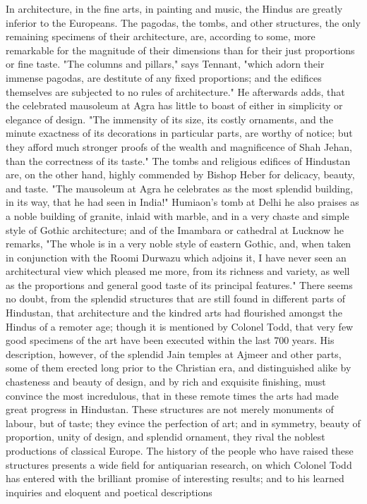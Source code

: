 \documentclass{article}
\begin{document}
In architecture, in the fine arts, in painting and music, the Hindus are greatly inferior to the Europeans. The pagodas, the tombs, and other structures, the only remaining specimens of their architecture, are, according to some, more remarkable for the magnitude of their dimensions than for their just proportions or fine taste. "The columns and pillars," says Tennant, "which adorn their immense pagodas, are destitute of any fixed proportions; and the edifices themselves are subjected to no rules of architecture." He afterwards adds, that the celebrated mausoleum at Agra has little to boast of either in simplicity or elegance of design. "The immensity of its size, its costly ornaments, and the minute exactness of its decorations in particular parts, are worthy of notice; but they afford much stronger proofs of the wealth and magnificence of Shah Jehan, than the correctness of its taste." The tombs and religious edifices of Hindustan are, on the other hand, highly commended by Bishop Heber for delicacy, beauty, and taste. "The mausoleum at Agra he celebrates as the most splendid building, in its way, that he had seen in India!" Humiaon's tomb at Delhi he also praises as a noble building of granite, inlaid with marble, and in a very chaste and simple style of Gothic architecture; and of the Imambara or cathedral at Lucknow he remarks, "The whole is in a very noble style of eastern Gothic, and, when taken in conjunction with the Roomi Durwazu which adjoins it, I have never seen an architectural view which pleased me more, from its richness and variety, as well as the proportions and general good taste of its principal features." There seems no doubt, from the splendid structures that are still found in different parts of Hindustan, that architecture and the kindred arts had flourished amongst the Hindus of a remoter age; though it is mentioned by Colonel Todd, that very few good specimens of the art have been executed within the last 700 years. His description, however, of the splendid Jain temples at Ajmeer and other parts, some of them erected long prior to the Christian era, and distinguished alike by chasteness and beauty of design, and by rich and exquisite finishing, must convince the most incredulous, that in these remote times the arts had made great progress in Hindustan. These structures are not merely monuments of labour, but of taste; they evince the perfection of art; and in symmetry, beauty of proportion, unity of design, and splendid ornament, they rival the noblest productions of classical Europe. The history of the people who have raised these structures presents a wide field for antiquarian research, on which Colonel Todd has entered with the brilliant promise of interesting results; and to his learned inquiries and eloquent and poetical descriptions
\end{document}
